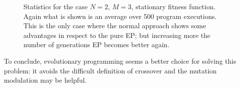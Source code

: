 \begin{figure}[h]
\centering
{}
\caption[]{Statistics for the case $N=2$, $M=3$, stationary fitness function. Again what is shown is an average over 500 program executions. This is the only case where the normal approach shows some advantages in respect to the pure EP; but increasing more the number of generations EP becomes better again.}
\label{plot23stationary}
\end{figure}



To conclude, evolutionary programming seems a better choice for solving this problem: it avoids the difficult definition of crossover and the mutation modulation may be helpful.

%
%
%
%